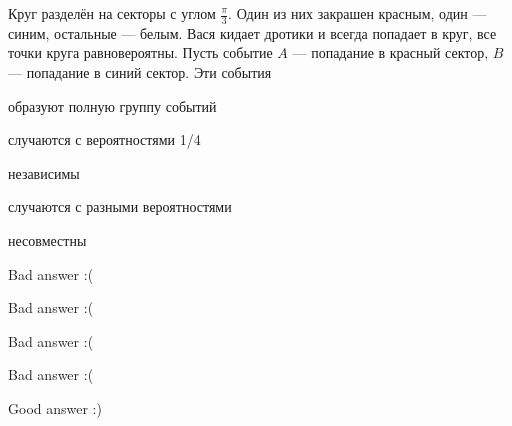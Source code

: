 
\begin{question}
Круг разделён на секторы с углом \(\frac{\pi}{3}\). Один из них закрашен
красным, один --- синим, остальные --- белым. Вася кидает дротики и
всегда попадает в круг, все точки круга равновероятны. Пусть событие
\(A\) --- попадание в красный сектор, \(B\) --- попадание в синий
сектор. Эти события
\begin{answerlist}
  \item образуют полную группу событий
  \item случаются с вероятностями 1/4
  \item независимы
  \item случаются с разными вероятностями
  \item несовместны
\end{answerlist}
\end{question}

\begin{solution}
\begin{answerlist}
  \item Bad answer :(
  \item Bad answer :(
  \item Bad answer :(
  \item Bad answer :(
  \item Good answer :)
\end{answerlist}
\end{solution}

